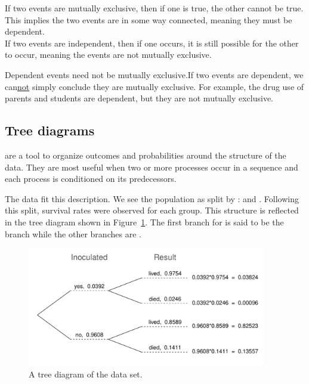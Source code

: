 \begin{tipBox}{
If two events are mutually exclusive, then if one is true, the other cannot be true. This implies the two events are in some way connected, meaning they must be dependent.\\
If two events are independent, then if one occurs, it is still possible for the other to occur, meaning the events are not mutually exclusive.}
\end{tipBox}

\begin{caution}{Dependent events need not be mutually exclusive.}{If two events are dependent, we can\underline{not} simply conclude they are mutually exclusive. For example, the drug use of parents and students are dependent, but they are not mutually exclusive.}
\end{caution}

\subsection{Tree diagrams}


 are a tool to organize outcomes and probabilities around the structure of the data. They are most useful when two or more processes occur in a sequence and each process is conditioned on its predecessors.

The  data fit this description. We see the population as split by :  and . Following this split, survival rates were observed for each group. This structure is reflected in the tree diagram shown in Figure~\ref{smallpoxTreeDiagram}. The first branch for  is said to be the  branch while the other branches are .

\begin{figure}[ht]
\centering
\includegraphics[width=0.93\textwidth]{ch_probability/figures/smallpoxTreeDiagram/smallpoxTreeDiagram}
\caption{A tree diagram of the  data set.}
\label{smallpoxTreeDiagram}
\end{figure}

